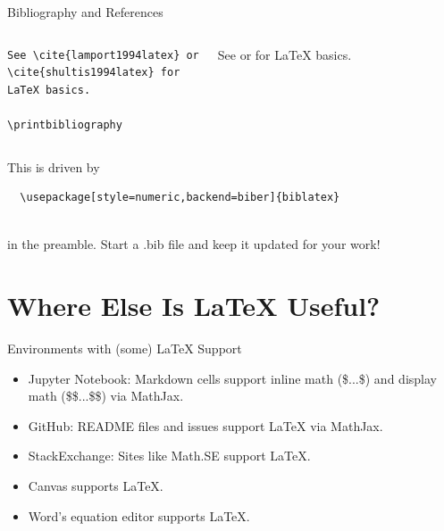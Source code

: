 \documentclass[aspectratio=1610]{beamer}
\begin{document}
\begin{frame}[fragile]{Bibliography and References}

  \begin{columns}[T]
      \begin{lstlisting}
See \cite{lamport1994latex} or
\cite{shultis1994latex} for
LaTeX basics.

\printbibliography
      \end{lstlisting}

See \cite{lamport1994latex} or
\cite{shultis1994latex} for
LaTeX basics.

\printbibliography

  \end{columns}

This is driven by
\begin{verbatim}
  \usepackage[style=numeric,backend=biber]{biblatex}
  
\end{verbatim}
in the preamble.  Start a .bib file and keep
it updated for your work!

\end{frame}

\section{Where Else Is \LaTeX{} Useful?}

\begin{frame}[fragile]{Environments with (some) \LaTeX{} Support}
\begin{itemize}
 \item Jupyter Notebook: Markdown cells support inline math (\$...\$)
  and display math (\$\$...\$\$) via MathJax.
 \item GitHub: README files and issues support LaTeX via MathJax.
 \item StackExchange: Sites like Math.SE support LaTeX.
 \item Canvas supports LaTeX.
 \item Word's equation editor supports LaTeX.
\end{itemize}
\end{frame}
\end{document}
